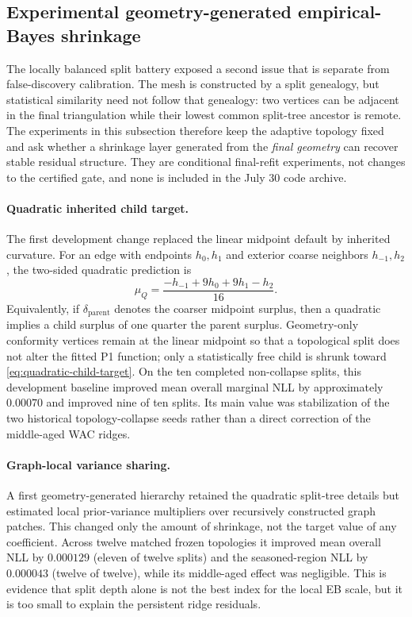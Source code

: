\documentclass[11pt]{article}
\begin{document}
\subsection{Experimental geometry-generated empirical-Bayes shrinkage}
\label{sec:geometry-eb}

The locally balanced split battery exposed a second issue that is separate from false-discovery
calibration. The mesh is constructed by a split genealogy, but statistical similarity need not
follow that genealogy: two vertices can be adjacent in the final triangulation while their lowest
common split-tree ancestor is remote. The experiments in this subsection therefore keep the
adaptive topology fixed and ask whether a shrinkage layer generated from the \emph{final geometry}
can recover stable residual structure. They are conditional final-refit experiments, not changes to
the certified gate, and none is included in the July 30 code archive.

\paragraph{Quadratic inherited child target.}
The first development change replaced the linear midpoint default by inherited curvature. For an
edge with endpoints $h_0,h_1$ and exterior coarse neighbors $h_{-1},h_2$, the two-sided quadratic
prediction is
\begin{equation}\label{eq:quadratic-child-target}
 \mu_{Q}=\frac{-h_{-1}+9h_0+9h_1-h_2}{16}.
\end{equation}
Equivalently, if $\delta_{\mathrm{parent}}$ denotes the coarser midpoint surplus, then a quadratic
implies a child surplus of one quarter the parent surplus. Geometry-only conformity vertices remain
at the linear midpoint so that a topological split does not alter the fitted P1 function; only a
statistically free child is shrunk toward \eqref{eq:quadratic-child-target}. On the ten completed
non-collapse splits, this development baseline improved mean overall marginal NLL by approximately
$0.00070$ and improved nine of ten splits. Its main value was stabilization of the two historical
topology-collapse seeds rather than a direct correction of the middle-aged WAC ridges.

\paragraph{Graph-local variance sharing.}
A first geometry-generated hierarchy retained the quadratic split-tree details but estimated local
prior-variance multipliers over recursively constructed graph patches. This changed only the amount
of shrinkage, not the target value of any coefficient. Across twelve matched frozen topologies it
improved mean overall NLL by $0.000129$ (eleven of twelve splits) and the seasoned-region NLL by
$0.000043$ (twelve of twelve), while its middle-aged effect was negligible. This is evidence that
split depth alone is not the best index for the local EB scale, but it is too small to explain the
persistent ridge residuals.
\end{document}
